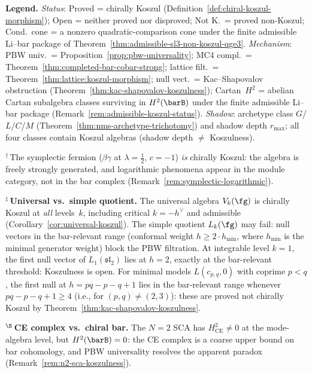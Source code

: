 \begin{table}[ht]
\smallskip\noindent
\textbf{Legend.}
\textit{Status}: Proved = chirally Koszul
(Definition~\ref{def:chiral-koszul-morphism});
Open = neither proved nor disproved;
Not K.\ = proved non-Koszul; Cond.\ cone = a nonzero quadratic-comparison
cone under the finite admissible Li--bar package of
Theorem~\ref{thm:admissible-sl3-non-koszul-qge3}.
\textit{Mechanism}: PBW univ.\ =
Proposition~\ref{prop:pbw-universality};
MC4 compl.\ =
Theorem~\ref{thm:completed-bar-cobar-strong};
lattice filt.\ =
Theorem~\ref{thm:lattice:koszul-morphism};
null vect.\ = Kac--Shapovalov obstruction
(Theorem~\ref{thm:kac-shapovalov-koszulness});
Cartan~$H^2$ = abelian Cartan subalgebra classes
surviving in $H^2(\barB)$ under the finite admissible Li--bar package
(Remark~\ref{rem:admissible-koszul-status}).
\textit{Shadow}: archetype class $G$/$L$/$C$/$M$
(Theorem~\ref{thm:nms-archetype-trichotomy})
and shadow depth $r_{\max}$;
all four classes contain Koszul algebras
(shadow depth $\neq$ Koszulness).

\smallskip\noindent
${}^{\dagger}$\,The symplectic fermion
($\beta\gamma$ at $\lambda = \tfrac{1}{2}$,
$c = -1$) \emph{is} chirally Koszul:
the algebra is freely strongly generated, and
logarithmic phenomena appear in the module category,
not in the bar complex
(Remark~\ref{rem:symplectic-logarithmic}).

\smallskip\noindent
${}^{\ddagger}$\,\textbf{Universal vs.\ simple quotient.}
The universal algebra $V_k(\fg)$ is chirally Koszul at
\emph{all} levels~$k$, including critical $k = -h^\vee$
and admissible (Corollary~\ref{cor:universal-koszul}).
The simple quotient $L_k(\fg)$ may fail: null vectors
in the bar-relevant range (conformal weight
$h \geq 2 \cdot h_{\min}$, where $h_{\min}$ is the
minimal generator weight) block the PBW filtration.
At integrable level $k = 1$, the first null vector of
$L_1(\mathfrak{sl}_2)$ lies at $h = 2$, exactly at the
bar-relevant threshold: Koszulness is open.
For minimal models $L(c_{p,q}, 0)$ with coprime $p < q$,
the first null at $h = pq - p - q + 1$ lies in the
bar-relevant range whenever $pq - p - q + 1 \geq 4$
(i.e., for $(p,q) \neq (2,3)$): these are proved
not chirally Koszul by
Theorem~\ref{thm:kac-shapovalov-koszulness}.

\smallskip\noindent
${}^{\S}$\,\textbf{CE complex vs.\ chiral bar.}
The $N{=}2$ SCA has $H^2_{\mathrm{CE}} \neq 0$
at the mode-algebra level, but $H^2(\barB) = 0$:
the CE complex is a coarse upper bound on bar cohomology,
and PBW universality resolves the apparent paradox
(Remark~\ref{rem:n2-sca-koszulness}).
\end{table}

